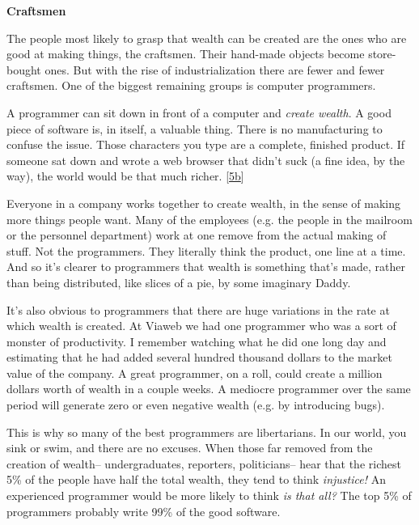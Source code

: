 \textbf{Craftsmen}

The people most likely to grasp that wealth can
                    be created are the ones who are good at making things, the
                    craftsmen. Their hand-made objects become store-bought ones.
                    But with the rise of industrialization there are fewer and
                    fewer craftsmen. One of the biggest remaining groups is
                    computer programmers.

A programmer can sit down
                    in front of a computer and \emph{create wealth}. A good
                    piece of software is, in itself, a valuable thing. There is
                    no manufacturing to confuse the issue. Those characters you
                    type are a complete, finished product. If someone sat down
                    and wrote a web browser that didn't suck (a fine idea, by
                    the way), the world would be that much richer.
                    [\href{\#f5bn}{5b}]

Everyone in a company works together to create
                    wealth, in the sense of making more things people want. Many
                    of the employees (e.g. the people in the mailroom or the
                    personnel department) work at one remove from the actual
                    making of stuff. Not the programmers. They literally think
                    the product, one line at a time. And so it's clearer to
                    programmers that wealth is something that's made, rather
                    than being distributed, like slices of a pie, by some
                    imaginary Daddy.

It's also obvious to programmers
                    that there are huge variations in the rate at which wealth
                    is created. At Viaweb we had one programmer who was a sort
                    of monster of productivity. I remember watching what he did
                    one long day and estimating that he had added several
                    hundred thousand dollars to the market value of the company.
                    A great programmer, on a roll, could create a million
                    dollars worth of wealth in a couple weeks. A mediocre
                    programmer over the same period will generate zero or even
                    negative wealth (e.g. by introducing bugs).

This
                    is why so many of the best programmers are libertarians. In
                    our world, you sink or swim, and there are no excuses. When
                    those far removed from the creation of wealth--
                    undergraduates, reporters, politicians-- hear that the
                    richest 5\% of the people have half the total wealth, they
                    tend to think \emph{injustice!}
                    An experienced programmer would be more likely to think
                    \emph{is that all?} The top 5\% of programmers probably write
                    99\% of the good software.

